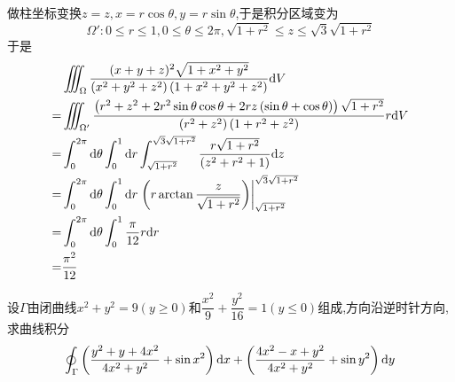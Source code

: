 \documentclass{ctexart}
\begin{document}
\begin{solution}
    做柱坐标变换$z=z,x=r\cos\theta,y=r\sin\theta$,于是积分区域变为
    \[\Omega':0\leqslant r\leqslant 1,0\leqslant\theta\leqslant2\pi,\sqrt{1+r^2}\leqslant z\leqslant \sqrt3\sqrt{1+r^2}\]
    于是
    \[\begin{aligned}
        &\iiint_{\Omega}\dfrac{(x+y+z)^2\sqrt{1+x^2+y^2}}{\left(x^2+y^2+z^2\right)\left(1+x^2+y^2+z^2\right)}\mathrm{d} V \\
        =&\iiint_{\Omega'}\dfrac{\left(r^2+z^2+2r^2\sin\theta\cos\theta+2rz\left(\sin\theta+\cos\theta\right)\right)\sqrt{1+r^2}}{\left(r^2+z^2\right)\left(1+r^2+z^2\right)}r\mathrm{d} V \\
        =&\int_0^{2\pi}\mathrm{d}\theta\int_0^1\mathrm{d} r\int_{\sqrt{1+r^2}}^{\sqrt3\sqrt{1+r^2}}\dfrac{r\sqrt{1+r^2}}{\left(z^2+r^2+1\right)}\mathrm{d} z \\
        =&\int_0^{2\pi}\mathrm{d}\theta\int_0^1\mathrm{d} r\left.\left(r\arctan\dfrac{z}{\sqrt{1+r^2}}\right)\right|_{\sqrt{1+r^2}}^{\sqrt3\sqrt{1+r^2}} \\
        =&\int_0^{2\pi}\mathrm{d}\theta\int_0^1\dfrac{\pi}{12}r\mathrm{d} r \\
        =&\dfrac{\pi^2}{12}
    \end{aligned}\]

\end{solution}
\begin{problem}[9.(10\songti{分})]
    设$\Gamma$由闭曲线$x^2+y^2=9(y\geqslant0)$和$\dfrac{x^2}{9}+\dfrac{y^2}{16}=1(y\leqslant0)$组成,方向沿逆时针方向,求曲线积分
    \[\oint_{\Gamma}\left(\dfrac{y^2+y+4x^2}{4x^2+y^2}+\sin x^2\right)\mathrm{d} x+\left(\dfrac{4x^2-x+y^2}{4x^2+y^2}+\sin y^2\right)\mathrm{d} y\]

\end{problem}
\end{document}
